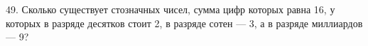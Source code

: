 49. Сколько существует стозначных чисел, сумма цифр которых равна 16, у которых в разряде десятков стоит 2, в разряде сотен --- 3, а в разряде миллиардов --- 9?\\
